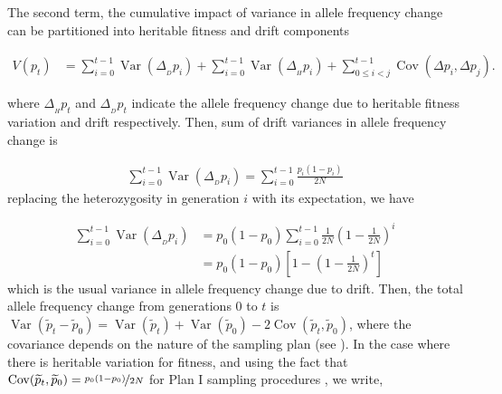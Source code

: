 \documentclass[11pt]{article}
\DeclareMathOperator{\var}{Var}
\DeclareMathOperator{\cov}{Cov}
\begin{document}
The second term, the cumulative impact of variance in allele frequency change
can be partitioned into heritable fitness and drift components
\parencite{Santiago1995-hx,Buffalo2019-io}

\begin{align}
  V(p_t) &= \sum_{i=0}^{t-1} \var(\Delta_{_D} p_i) + \sum_{i=0}^{t-1} \var(\Delta_{_H} p_i) + \sum_{0 \le i < j}^{t-1} \cov(\Delta p_i, \Delta p_j).
\end{align}

where $\Delta_{_H} p_t$ and $\Delta_{_D} p_t$ indicate the allele frequency
change due to heritable fitness variation and drift respectively. Then, sum of
drift variances in allele frequency change is

\begin{align}
  \sum_{i=0}^{t-1} \var(\Delta_{_D} p_i) = \sum_{i=0}^{t-1} \frac{p_i(1-p_i)}{2N}
\end{align}
%
replacing the heterozygosity in generation $i$ with its expectation, we have

\begin{align}
  \sum_{i=0}^{t-1} \var(\Delta_{_D} p_i) &= p_0(1-p_0) \sum_{i=0}^{t-1} \frac{1}{2N} \left(1-\frac{1}{2N}\right)^i \\
                                         &= p_0(1-p_0) \left[1 - \left(1-\frac{1}{2N}\right)^t \right]
\end{align}
%
which is the usual variance in allele frequency change due to drift.  Then, the
total allele frequency change from generations $0$ to $t$ is
$\var(\widetilde{p}_t - \widetilde{p}_0) = \var(\widetilde{p}_t) +
\var(\widetilde{p}_0) - 2 \cov(\widetilde{p}_t, \widetilde{p}_0)$, where the
covariance depends on the nature of the sampling plan (see \cite{Nei1981-oy,
Waples1989-sj}). In the case where there is heritable variation for fitness,
and using the fact that $\cov(\widetilde{p}_t, \widetilde{p}_0) =
\nicefrac{p_0(1-p_0)}{2N}$ for Plan I sampling procedures
\parencite{Waples1989-sj}, we write,
\end{document}
